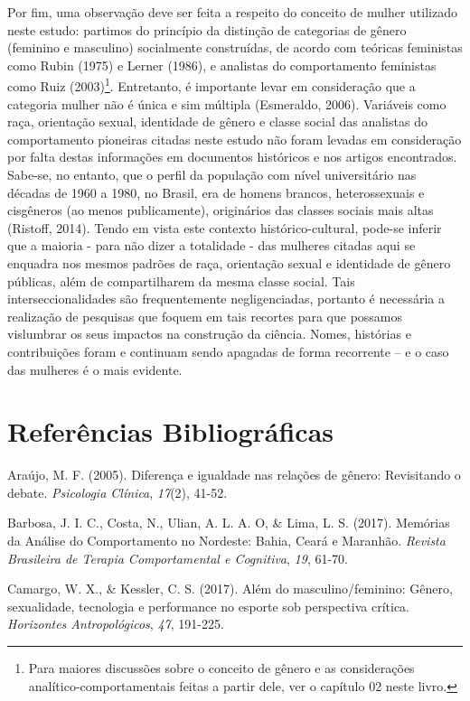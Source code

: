 Por fim, uma observação deve ser feita a respeito do conceito de mulher utilizado neste estudo: partimos do princípio da distinção de categorias de gênero (feminino e masculino) socialmente construídas, de acordo com teóricas feministas como Rubin (1975) e Lerner (1986), e analistas do comportamento feministas como Ruiz (2003)\footnote{Para maiores discussões sobre o conceito de gênero e as considerações analítico-comportamentais feitas a partir dele, ver o capítulo 02 neste livro.}. Entretanto, é importante levar em consideração que a categoria mulher não é única e sim múltipla (Esmeraldo, 2006). Variáveis como raça, orientação sexual, identidade de gênero e classe social das analistas do comportamento pioneiras citadas neste estudo não foram levadas em consideração por falta destas informações em documentos históricos e nos artigos encontrados. Sabe-se, no entanto, que o perfil da população com nível universitário nas décadas de 1960 a 1980, no Brasil, era de homens brancos, heterossexuais e cisgêneros (ao menos publicamente), originários das classes sociais mais altas (Ristoff, 2014). Tendo em vista este contexto histórico-cultural, pode-se inferir que a maioria - para não dizer a totalidade - das mulheres citadas aqui se enquadra nos mesmos padrões de raça, orientação sexual e identidade de gênero públicas, além de compartilharem da mesma classe social. Tais interseccionalidades são frequentemente negligenciadas, portanto é necessária a realização de pesquisas que foquem em tais recortes para que possamos vislumbrar os seus impactos na construção da ciência. Nomes, histórias e contribuições foram e continuam sendo apagadas de forma recorrente – e o caso das mulheres é o mais evidente.
\vfill
\pagebreak
\section*{Referências Bibliográficas}
\hangindent=25pt
\noindent Araújo, M. F. (2005). Diferença e igualdade nas relações de gênero: Revisitando o debate. \textit{Psicologia Clínica},\textit{ 17}(2), 41-52.

\hangindent=25pt
\noindent Barbosa, J. I. C., Costa, N., Ulian, A. L. A. O, \& Lima, L. S. (2017). Memórias da Análise do Comportamento no Nordeste: Bahia, Ceará e Maranhão. \textit{Revista Brasileira de Terapia Comportamental e Cognitiva},\textit{ 19}, 61-70.

\hangindent=25pt
\noindent Camargo, W. X., \& Kessler, C. S. (2017). Além do masculino/feminino: Gênero, sexualidade, tecnologia e performance no esporte sob perspectiva crítica. \textit{Horizontes Antropológicos},\textit{ 47}, 191-225.

